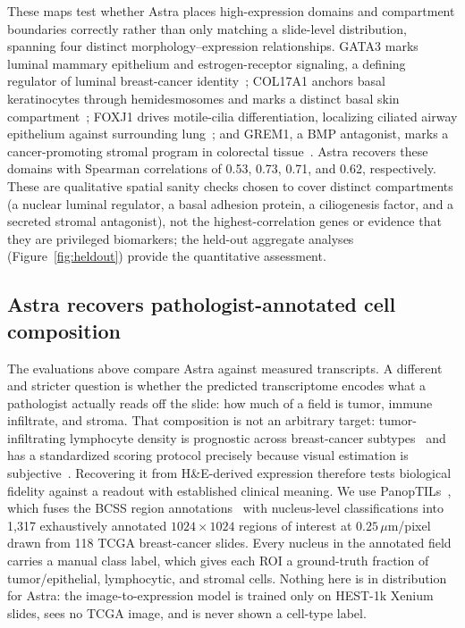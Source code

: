 \documentclass[11pt]{article}
\begin{document}
These maps test whether Astra places high-expression domains and compartment
boundaries correctly rather than only matching a slide-level distribution,
spanning four distinct morphology--expression relationships. GATA3 marks luminal
mammary epithelium and estrogen-receptor signaling, a defining regulator of
luminal breast-cancer identity~\cite{gata3_breast}; COL17A1 anchors basal
keratinocytes through hemidesmosomes and marks a distinct basal skin
compartment~\cite{col17_skin}; FOXJ1 drives motile-cilia differentiation,
localizing ciliated airway epithelium against surrounding lung~\cite{foxj1_lung};
and GREM1, a BMP antagonist, marks a cancer-promoting stromal program in
colorectal tissue~\cite{grem1_crc}. Astra recovers these domains with Spearman
correlations of 0.53, 0.73, 0.71, and 0.62, respectively. These are qualitative
spatial sanity checks chosen to cover distinct compartments (a nuclear luminal
regulator, a basal adhesion protein, a ciliogenesis factor, and a secreted
stromal antagonist), not the highest-correlation genes or evidence that they are
privileged biomarkers; the held-out aggregate analyses
(Figure~\ref{fig:heldout}) provide the quantitative assessment.

\subsection{Astra recovers pathologist-annotated cell composition}
\label{sec:panoptils}

The evaluations above compare Astra against measured transcripts. A different
and stricter question is whether the predicted transcriptome encodes what a
pathologist actually reads off the slide: how much of a field is tumor, immune
infiltrate, and stroma. That composition is not an arbitrary target:
tumor-infiltrating lymphocyte density is prognostic across breast-cancer
subtypes~\cite{tils_denkert} and has a standardized scoring protocol precisely
because visual estimation is subjective~\cite{tils_working_group}. Recovering it
from H\&E-derived expression therefore tests biological fidelity against a
readout with established clinical meaning. We use
PanopTILs~\cite{panoptils}, which fuses the BCSS region annotations~\cite{bcss}
with nucleus-level classifications into 1{,}317 exhaustively annotated
$1024\times1024$ regions of interest at $0.25\,\mu$m/pixel drawn from 118 TCGA
breast-cancer slides. Every nucleus in the annotated field carries a manual class
label, which gives each ROI a ground-truth fraction of tumor/epithelial,
lymphocytic, and stromal cells. Nothing here is in distribution for Astra: the
image-to-expression model is trained only on HEST-1k Xenium slides, sees no TCGA
image, and is never shown a cell-type label.
\end{document}
